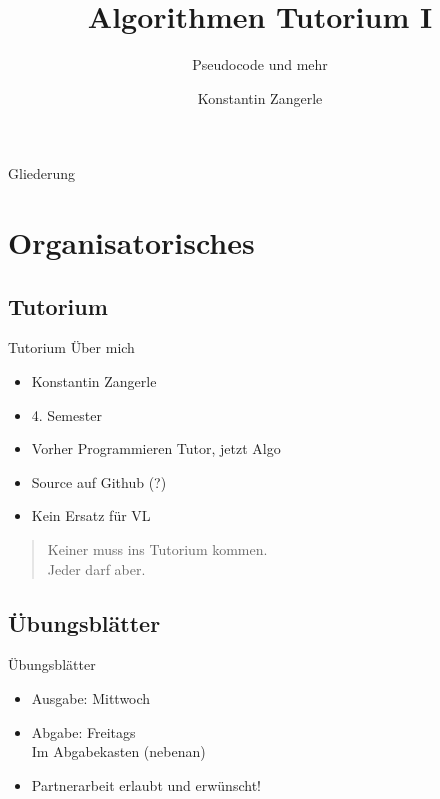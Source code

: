 \documentclass[18pt]{beamer}
\title[Algo I Tut]{Algorithmen Tutorium I}
\subtitle{Pseudocode und mehr}
\author[Zangerle]{Konstantin Zangerle}
\institute{Institut für Theoretische Informatik}
\begin{document}

\begin{frame}
\titlepage
\end{frame}

\begin{frame}{Gliederung}
 \tableofcontents
\end{frame}

\section{Organisatorisches}
\subsection{Tutorium}

\begin{frame}{Tutorium}
Über mich
\begin{itemize}
 \item Konstantin Zangerle
 \item 4. Semester
 \item Vorher Programmieren Tutor, jetzt Algo
 \item Source auf Github (?)
 \item Kein Ersatz für VL
\end{itemize}

  \begin{quotation}
 Keiner muss ins Tutorium kommen. \\
 Jeder darf aber.  
  \end{quotation}

 
\end{frame}

\subsection{Übungsblätter}
\begin{frame}{Übungsblätter}
 \begin{itemize}
  \item Ausgabe: Mittwoch
  \item Abgabe: Freitags \\
    Im Abgabekasten (nebenan)
  \item Partnerarbeit erlaubt und erwünscht!
  
 \end{itemize}

\end{frame}
\end{document}
